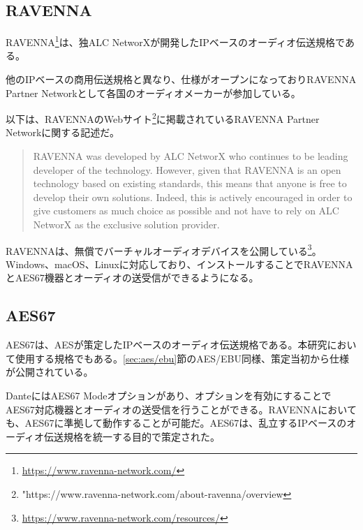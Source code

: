 \subsection{RAVENNA}

RAVENNA\footnote{\url{https://www.ravenna-network.com/}}は、独ALC NetworXが開発したIPベースのオーディオ伝送規格である。

他のIPベースの商用伝送規格と異なり、仕様がオープンになっておりRAVENNA Partner Networkとして各国のオーディオメーカーが参加している。

以下は、RAVENNAのWebサイト\footnote{"https://www.ravenna-network.com/about-ravenna/overview}に掲載されているRAVENNA Partner Networkに関する記述だ。

\begin{quotation}
  RAVENNA was developed by ALC NetworX who continues to be leading developer of the technology. However, given that RAVENNA is an open technology based on existing standards, this means that anyone is free to develop their own solutions. Indeed, this is actively encouraged in order to give customers as much choice as possible and not have to rely on ALC NetworX as the exclusive solution provider.
\end{quotation}

RAVENNAは、無償でバーチャルオーディオデバイスを公開している\footnote{\url{https://www.ravenna-network.com/resources/}}。Windows、macOS、Linuxに対応しており、インストールすることでRAVENNAとAES67機器とオーディオの送受信ができるようになる。

\subsection{AES67}

AES67は、AESが策定したIPベースのオーディオ伝送規格である。本研究において使用する規格でもある。\ref{sec:aes/ebu}節のAES/EBU同様、策定当初から仕様が公開されている。

DanteにはAES67 Modeオプションがあり、オプションを有効にすることでAES67対応機器とオーディオの送受信を行うことができる。RAVENNAにおいても、AES67に準拠して動作することが可能だ。AES67は、乱立するIPベースのオーディオ伝送規格を統一する目的で策定された。
